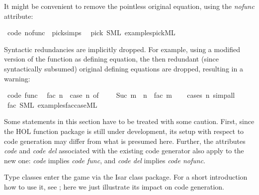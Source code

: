 \begin{isabellebody}
\begin{isamarkuptext}

  It might be convenient to remove the pointless original
  equation, using the \emph{nofunc} attribute:%
\end{isamarkuptext}%
\isamarkuptrue%
\isamarkupfalse%
\ {\isacharbrackleft}code\ nofunc{\isacharbrackright}\ {\isacharequal}\ pick{\isachardot}simps\ \isanewline
\isanewline
{}\isamarkupfalse%
\ pick\ {\isacharparenleft}SML\ {\isachardoublequoteopen}examples{\isacharslash}pick{}{\isachardot}ML{\isachardoublequoteclose}{\isacharparenright}%
\begin{isamarkuptext}%

  Syntactic redundancies are implicitly dropped. For example,
  using a modified version of the  function
  as defining equation, the then redundant (since
  syntactically subsumed) original defining equations
  are dropped, resulting in a warning:%
\end{isamarkuptext}%
\isamarkuptrue%
\isamarkupfalse%
\ {\isacharbrackleft}code\ func{\isacharbrackright}{\isacharcolon}\isanewline
\ \ {\isachardoublequoteopen}fac\ n\ {\isacharequal}\ {\isacharparenleft}case\ n\ of\ {}\ {\isasymRightarrow}\ {}\ {\isacharbar}\ Suc\ m\ {\isasymRightarrow}\ n\ {\isacharasterisk}\ fac\ m{\isacharparenright}{\isachardoublequoteclose}\isanewline
%
\isadelimproof
\ \ %
\endisadelimproof
%
\isatagproof
{}\isamarkupfalse%
\ {\isacharparenleft}cases\ n{\isacharparenright}\ simp{\isacharunderscore}all%
\endisatagproof
{\isafoldproof}%
%
\isadelimproof
\isanewline
%
\endisadelimproof
\isanewline
{}\isamarkupfalse%
\ fac\ {\isacharparenleft}SML\ {\isachardoublequoteopen}examples{\isacharslash}fac{\isacharunderscore}case{\isachardot}ML{\isachardoublequoteclose}{\isacharparenright}%
\begin{isamarkuptext}%

  \begin{warn}
    Some statements in this section have to be treated with some
    caution. First, since the HOL function package is still
    under development, its setup with respect to code generation
    may differ from what is presumed here.
    Further, the attributes \emph{code} and \emph{code del}
    associated with the existing code generator also apply to
    the new one: \emph{code} implies \emph{code func},
    and \emph{code del} implies \emph{code nofunc}.
  \end{warn}%
\end{isamarkuptext}%
\isamarkuptrue%
%
\isamarkuptrue%
%
\begin{isamarkuptext}%
Type classes enter the game via the Isar class package.
  For a short introduction how to use it, see \cite{isabelle-classes};
  here we just illustrate its impact on code generation.


\end{isamarkuptext}
\end{isabellebody}
